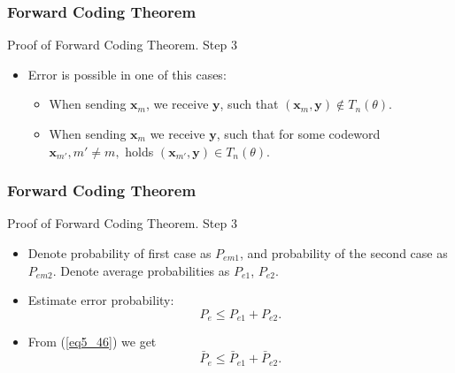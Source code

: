 \documentclass[14pt]{beamer}
\renewcommand{\vec}[1]{\ensuremath{\boldsymbol{#1}}}
\begin{document}
\begin{frame}
\frametitle{Forward Coding Theorem}
Proof of Forward Coding Theorem. Step 3
\begin{itemize}    
    
    \item Error is possible in one of this cases:
    \begin{itemize}
    \item
    When sending ${\vec x}_m $, we receive ${\vec y}$, such that $({\vec x}_m ,{\vec y}) \notin T_n(\theta) $.
    \item
    When sending ${\vec x}_m $ we receive ${\vec y}$, such that for some codeword ${\vec x}_{m'}, m' \ne m,$ holds $(\vec x_{m'},\vec y) \in T_n(\theta)$.
    \end{itemize}

\end{itemize}
\end{frame}


\begin{frame}
\frametitle{Forward Coding Theorem}
Proof of Forward Coding Theorem. Step 3
\begin{itemize} 

    \item Denote probability of first case as $P_{em1}$, and probability of the second case as $P_{em2}$. Denote average probabilities as $P_{e1}$, $P_{e2} $. 
    
    \item Estimate error probability:
    \begin{equation}
    \label{eq5_46} P_e \le P_{e1} + P_{e2} .
    \end{equation}

    \item From (\ref{eq5_46}) we get
    \begin{equation}
    \label{eq5_47} \bar {P}_e \le \bar {P}_{e1} + \bar {P}_{e2} .
    \end{equation}

\end{itemize}
\end{frame}
\end{document}
